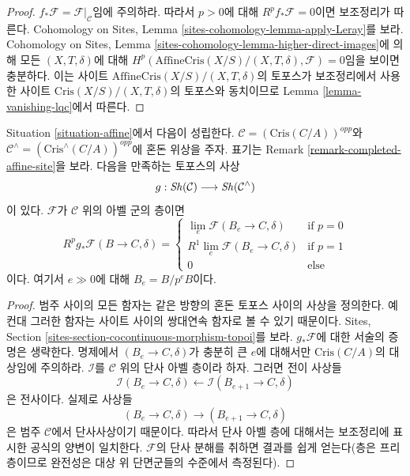 \begin{proof}
\medskip\noindent
$f_*\mathcal{F} = \mathcal{F}|_\mathcal{C}$임에 주의하라. 따라서
$p > 0$에 대해 $R^pf_*\mathcal{F} = 0$이면 보조정리가 따른다.
Cohomology on Sites, Lemma \ref{sites-cohomology-lemma-apply-Leray}를
보라. Cohomology on Sites, Lemma
\ref{sites-cohomology-lemma-higher-direct-images}에 의해 모든
$(X, T, \delta)$에 대해
$H^p(\text{AffineCris}(X/S)/(X, T, \delta), \mathcal{F}) = 0$임을
보이면 충분하다. 이는 사이트
$\text{AffineCris}(X/S)/(X, T, \delta)$의 토포스가 보조정리에서
사용한 사이트 $\text{Cris}(X/S)/(X, T, \delta)$의 토포스와
동치이므로 Lemma \ref{lemma-vanishing-lqc}에서 따른다.
\end{proof}

\begin{lemma}
\label{lemma-complete}
Situation \ref{situation-affine}에서 다음이 성립한다.
$\mathcal{C} = (\text{Cris}(C/A))^{opp}$와
$\mathcal{C}^\wedge = (\text{Cris}^\wedge(C/A))^{opp}$에 혼돈 위상을
주자. 표기는 Remark \ref{remark-completed-affine-site}을 보라.
다음을 만족하는 토포스의 사상
$$
g : \mathop{\mathit{Sh}}\nolimits(\mathcal{C}) \longrightarrow \mathop{\mathit{Sh}}\nolimits(\mathcal{C}^\wedge)
$$
이 있다. $\mathcal{F}$가 $\mathcal{C}$ 위의 아벨 군의 층이면
$$
R^pg_*\mathcal{F}(B \to C, \delta) =
\left\{
\begin{matrix}
\lim_e \mathcal{F}(B_e \to C, \delta) & \text{if }p = 0 \\
R^1\lim_e \mathcal{F}(B_e \to C, \delta) & \text{if }p = 1 \\
0 & \text{else}
\end{matrix}
\right.
$$
이다. 여기서 $e \gg 0$에 대해 $B_e = B/p^eB$이다.
\end{lemma}

\begin{proof}
범주 사이의 모든 함자는 같은 방향의 혼돈 토포스 사이의 사상을
정의한다. 예컨대 그러한 함자는 사이트 사이의 쌍대연속 함자로
볼 수 있기 때문이다. Sites, Section
\ref{sites-section-cocontinuous-morphism-topoi}를 보라.
$g_*\mathcal{F}$에 대한 서술의 증명은 생략한다. 명제에서
$(B_e \to C, \delta)$가 충분히 큰 $e$에 대해서만
$\text{Cris}(C/A)$의 대상임에 주의하라.
$\mathcal{I}$를 $\mathcal{C}$ 위의 단사 아벨 층이라 하자. 그러면
전이 사상들
$$
\mathcal{I}(B_e \to C, \delta) \leftarrow
\mathcal{I}(B_{e + 1} \to C, \delta)
$$
은 전사이다. 실제로 사상들
$$
(B_e \to C, \delta)
\longrightarrow
(B_{e + 1} \to C, \delta)
$$
은 범주 $\mathcal{C}$에서 단사사상이기 때문이다. 따라서 단사
아벨 층에 대해서는 보조정리에 표시한 공식의 양변이 일치한다.
$\mathcal{F}$의 단사 분해를 취하면 결과를 쉽게 얻는다(층은
프리층이므로 완전성은 대상 위 단면군들의 수준에서 측정된다).
\end{proof}

